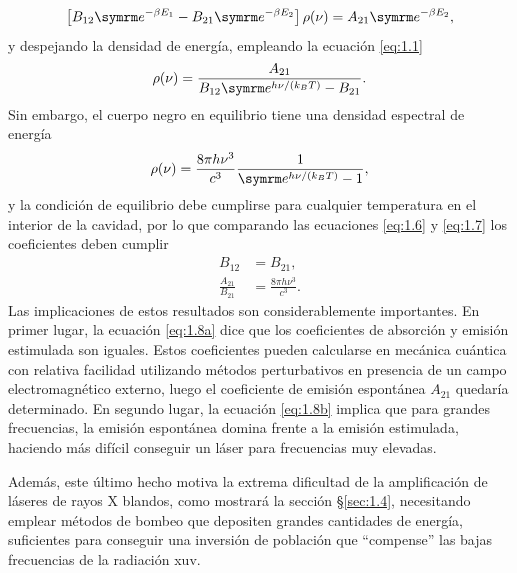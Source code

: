 \begin{equation}\label{eq:1.5}
  \left[B_{12}\eu^{-\beta E_{1}}-B_{21}\eu^{-\beta E_{2}}\right] \rho(\nu) = A_{21}\eu^{-\beta E_{2}},
\end{equation}
y despejando la densidad de energía, empleando la ecuación \eqref{eq:1.1}
\begin{equation}\label{eq:1.6}
  \rho(\nu) = \frac{A_{21}}{B_{12}\eu^{h \nu/(k_{B}T)} - B_{21}}.
\end{equation}
Sin embargo, el cuerpo negro en equilibrio tiene una densidad espectral de energía \autocite{Feynman2011}
\begin{equation}\label{eq:1.7}
  \rho(\nu) = \frac{8 \pi h \nu^{3}}{c^{3}}\frac{1}{\eu^{h \nu/(k_{B}T)} - 1},
\end{equation}
y la condición de equilibrio debe cumplirse para cualquier temperatura en el interior de la cavidad, por lo que comparando las ecuaciones \eqref{eq:1.6} y \eqref{eq:1.7} los coeficientes deben cumplir
\begin{align}
  \label{eq:1.8a}
  B_{12} &= B_{21}, \\
  \label{eq:1.8b}
  \frac{A_{21}}{B_{21}} &= \frac{8 \pi h \nu^{3}}{c^{3}}.
\end{align}
Las implicaciones de estos resultados son considerablemente importantes. En primer lugar, la ecuación \eqref{eq:1.8a} dice que los coeficientes de absorción y emisión estimulada son iguales. Estos coeficientes pueden calcularse en mecánica cuántica \autocite{Sakurai2020} con relativa facilidad utilizando métodos perturbativos en presencia de un campo electromagnético externo, luego el coeficiente de emisión espontánea $A_{21}$ quedaría determinado. En segundo lugar, la ecuación \eqref{eq:1.8b} implica que para grandes frecuencias, la emisión espontánea domina frente a la emisión estimulada, haciendo más difícil conseguir un láser para frecuencias muy elevadas. 

Además, este último hecho motiva la extrema dificultad de la amplificación de láseres de rayos X blandos, como mostrará la sección \S\ref{sec:1.4}, necesitando emplear métodos de bombeo que depositen grandes cantidades de energía, suficientes para conseguir una inversión de población que \enquote{compense} las bajas frecuencias de la radiación \acrshort{xuv}. 

